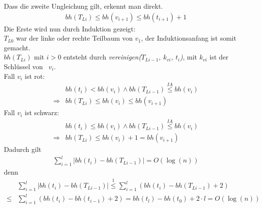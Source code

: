 \documentclass[a4paper,12pt]{article}
\begin{document}
\noindent Dass die zweite Ungleichung gilt, erkennt man direkt. 
\begin{align}
\mathit{bh}(T_{Li}) \leq \mathit{bh}(v_{i+1}) \leq\mathit{bh}(t_{i+1}) + 1  
\end{align}
Die Erste wird nun durch Induktion gezeigt:\\
$T_{L0}$ war der linke oder rechte Teilbaum von $v_1$, der Induktionsanfang ist somit gemacht.\\
$\mathit{bh}(T_{Li})$ mit $i > 0$  entsteht durch \textit{vereinigen($T_{Li-1}$, $k_{vi}$, $t_i$)}, mit $k_{vi}$ ist der Schlüssel von~ $v_i$.\\ 
Fall $v_i$ ist rot:
\begin{align*}
&\mathit{bh}(t_i) < \mathit{bh}(v_i)  \land  \mathit{bh}(T_{Li-1})  \overset{\textit{IA}}{\leq}  \mathit{bh}(v_{i}) \\
\Rightarrow  & \mathit{bh}(T_{Li})  \leq  \mathit{bh}(v_{i}) \leq  \mathit{bh}(v_{i+1}) 
\end{align*}
Fall $v_i$ ist schwarz:
\begin{align*}
&\mathit{bh}(t_i) \leq \mathit{bh}(v_i)  \land  \mathit{bh}(T_{Li-1})  \overset{\textit{IA}}{\leq}  \mathit{bh}(v_{i}) \\
\Rightarrow  &\mathit{bh}(T_{Li})  \leq \mathit{bh}(v_{i}) + 1 =    \mathit{bh}(v_{i+1})
\end{align*}
Dadurch gilt
\begin{align}
\sum_{i = 1}^{l} \vert\mathit{bh} \left(t_{i} \right) -\mathit{bh} \left(T_{Li-1} \right) \vert =  O \left(\log \left(n \right) \right)
\end{align}
denn
\begin{align*}
&\sum_{i = 1}^{l} \vert\mathit{bh} \left(t_{i} \right) -\mathit{bh} \left(T_{Li-1} \right) \vert \overset{\textit{1}}{\leq}
\sum_{i = 1}^{l} \left( \mathit{bh} \left(t_{i} \right) -\mathit{bh} \left(T_{Li-1} \right) + 2\right)\\
\leq &\sum_{i = 1}^{l} \left( \mathit{bh} \left(t_{i} \right) -\mathit{bh} \left(t_{i-1} \right) + 2\right)
=  \mathit{bh} \left(t_{l} \right) -\mathit{bh} \left(t_{0} \right) + 2 \cdot l  = O \left(\log \left(n \right) \right)
\end{align*}
\end{document}
